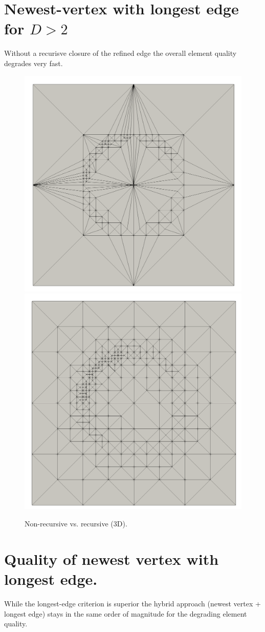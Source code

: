 \documentclass{article}
\begin{document}
\clearpage

\section{Newest-vertex with longest edge for $D>2$}

Without a recurisve closure of the refined edge the overall element quality degrades very fast.

\begin{figure}[htbp]
	\centering
	\includegraphics[width=0.48\linewidth]{figures/non-recursive} \hfill
	\includegraphics[width=0.48\linewidth]{figures/recursive}
	\caption{Non-recursive vs. recursive (3D).}
	\label{fig:metrics}
\end{figure}

\section{Quality of newest vertex with longest edge.}

While the longest-edge criterion is superior the hybrid approach (newest vertex + longest edge) 
stays in the same order of magnitude for the degrading element quality.
\end{document}

